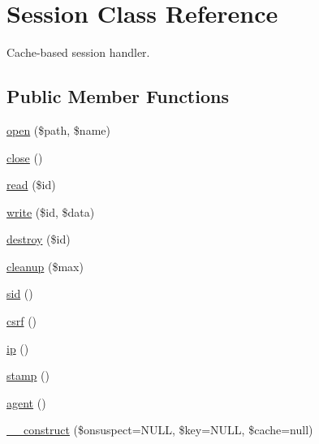 \hypertarget{class_session}{}\section{Session Class Reference}
\label{class_session}


Cache-\/based session handler.  


\subsection*{Public Member Functions}
\begin{DoxyCompactItemize}
\item 
\hyperlink{class_session_a037c59224bcb347b69ca61df88ef7230}{open} (\$path, \$name)
\item 
\hyperlink{class_session_aa69c8bf1f1dcf4e72552efff1fe3e87e}{close} ()
\item 
\hyperlink{class_session_afa59bebedda70c37b94c2efc35da83f3}{read} (\$id)
\item 
\hyperlink{class_session_a5f277b5f0e4e2154cddc9a3a0d2bf57d}{write} (\$id, \$data)
\item 
\hyperlink{class_session_a726fa8a4b4b187b9ca32ba427aac8137}{destroy} (\$id)
\item 
\hyperlink{class_session_a60b027eb0df6d42b8fe2ec8c93cfbbae}{cleanup} (\$max)
\item 
\hyperlink{class_session_a30b416c35150ab6bdde364f527f612bd}{sid} ()
\item 
\hyperlink{class_session_a048d24aa22a28f92f1f3a7e3d323f45e}{csrf} ()
\item 
\hyperlink{class_session_a197bae3714812901860bd006b00f91de}{ip} ()
\item 
\hyperlink{class_session_ab0b8b94527259f4aacdf1fd45411abfe}{stamp} ()
\item 
\hyperlink{class_session_a77f6a261d70e66c7b7273774832482dc}{agent} ()
\item 
\hyperlink{class_session_ab1c90919b8dc85f2d3eaf14f5b629815}{\+\_\+\+\_\+construct} (\$onsuspect=N\+U\+LL, \$key=N\+U\+LL, \$cache=null)
\end{DoxyCompactItemize}
